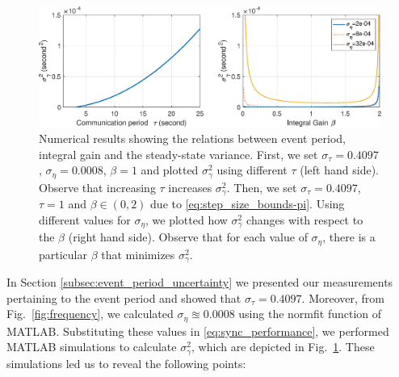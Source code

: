 \documentclass[10pt,journal,compsoc]{IEEEtran}
\begin{document}
\begin{figure}
	\centering
	\includegraphics[width=1.4\columnwidth]{figures/alpha-period-vs-variance.eps}
	\caption{\label{fig:simulations} Numerical results showing the relations between event period, integral gain and the steady-state variance. First, we set $\sigma_{\tau}=0.4097$, $\sigma_\eta = 0.0008$, $\beta=1$ and plotted $\sigma^2_{\gamma}$ using different $\tau$ (left hand side). Observe that increasing $\tau$ increases $\sigma^2_{\gamma}$. Then, we set $\sigma_{\tau}=0.4097$,	$\tau=1$ and $\beta \in (0,2)$ due to \eqref{eq:step_size_bounds-pi}. Using different values for $\sigma_\eta$, we plotted how $\sigma^2_{\gamma}$ changes with respect to the $\beta$ (right hand side). Observe that for each value of $\sigma_\eta$, there is a particular $\beta$ that minimizes $\sigma^2_{\gamma}$.}
\end{figure}

In Section \ref{subsec:event_period_uncertainty} we presented our measurements pertaining to the event period and showed 
that $\sigma_{\tau}=0.4097$. Moreover, from Fig.~\ref{fig:frequency}, we calculated $\sigma_{\eta} \approxeq 0.0008$ using the \textsf{normfit} function of MATLAB.  Substituting these values in \eqref{eq:sync_performance}, we performed MATLAB simulations to calculate $\sigma^2_\gamma$, which are depicted in Fig.~\ref{fig:simulations}. These simulations led us to reveal the following points:
\end{document}
